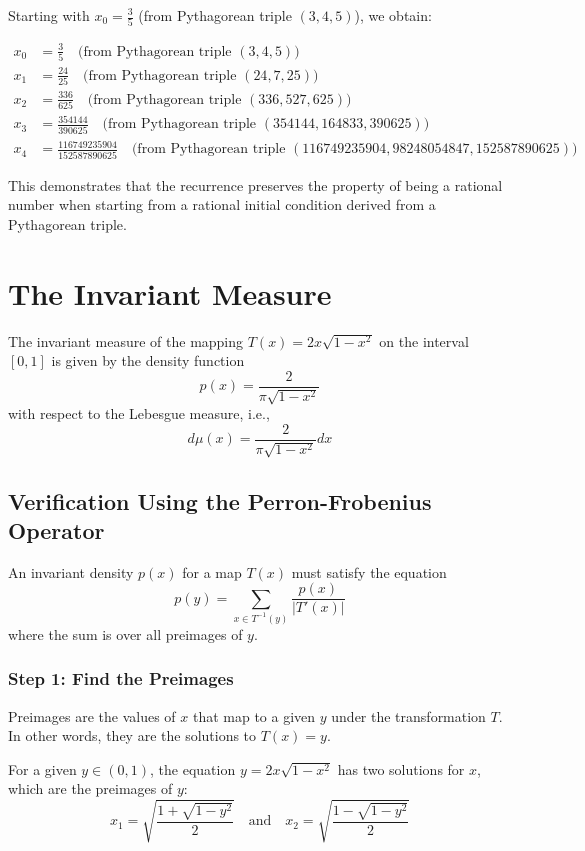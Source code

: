 \documentclass[12pt,a4paper]{article}
\begin{document}
Starting with $x_0 = \frac{3}{5}$ (from Pythagorean triple $(3, 4, 5)$), we obtain:

\begin{align*}
x_0 &= \frac{3}{5} \quad \text{(from Pythagorean triple $(3, 4, 5)$)} \\
x_1 &= \frac{24}{25} \quad \text{(from Pythagorean triple $(24, 7, 25)$)} \\
x_2 &= \frac{336}{625} \quad \text{(from Pythagorean triple $(336, 527, 625)$)} \\
x_3 &= \frac{354144}{390625} \quad \text{(from Pythagorean triple $(354144, 164833, 390625)$)} \\
x_4 &= \frac{116749235904}{152587890625} \quad \text{(from Pythagorean triple $(116749235904, 98248054847, 152587890625)$)}
\end{align*}

This demonstrates that the recurrence preserves the property of being a rational number when starting from a rational initial condition derived from a Pythagorean triple.

\section{The Invariant Measure}

The invariant measure of the mapping $T(x) = 2x\sqrt{1-x^2}$ on the interval $[0, 1]$ is given by the density function 
\[
p(x) = \frac{2}{\pi\sqrt{1-x^2}}
\]
with respect to the Lebesgue measure, i.e., 
\[
d\mu(x) = \frac{2}{\pi\sqrt{1-x^2}}dx
\]

\subsection{Verification Using the Perron-Frobenius Operator}

An invariant density $p(x)$ for a map $T(x)$ must satisfy the equation 
\[
p(y) = \sum_{x \in T^{-1}(y)} \frac{p(x)}{|T'(x)|}
\]
where the sum is over all preimages of $y$.

\subsubsection{Step 1: Find the Preimages}

Preimages are the values of $x$ that map to a given $y$ under the transformation $T$. In other words, they are the solutions to $T(x) = y$.

For a given $y \in (0, 1)$, the equation $y = 2x\sqrt{1-x^2}$ has two solutions for $x$, which are the preimages of $y$:
\[
x_1 = \sqrt{\frac{1+\sqrt{1-y^2}}{2}} \quad \text{and} \quad x_2 = \sqrt{\frac{1-\sqrt{1-y^2}}{2}}
\]
\end{document}
